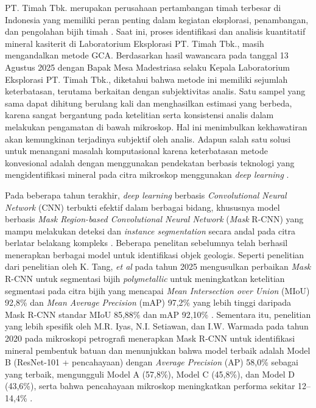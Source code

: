 PT. Timah Tbk. merupakan perusahaan pertambangan timah terbesar di Indonesia yang memiliki peran penting dalam kegiatan eksplorasi, penambangan, dan pengolahan bijih timah \cite{PTTimahWebsite}. Saat ini, proses identifikasi dan analisis kuantitatif mineral kasiterit di Laboratorium Eksplorasi PT. Timah Tbk., masih mengandalkan metode GCA. Berdasarkan hasil wawancara pada tanggal 13 Agustus 2025 dengan Bapak Mesa Madestriasa selaku Kepala Laboratorium Eksplorasi PT. Timah Tbk., diketahui bahwa metode ini memiliki sejumlah keterbatasan, terutama berkaitan dengan subjektivitas analis. Satu sampel yang sama dapat dihitung berulang kali dan menghasilkan estimasi yang berbeda, karena sangat bergantung pada ketelitian serta konsistensi analis dalam melakukan pengamatan di bawah mikroskop. Hal ini menimbulkan kekhawatiran akan kemungkinan terjadinya subjektif oleh analis. Adapun salah satu solusi untuk menangani masalah komputasional karena keterbatasan metode konvesional adalah dengan menggunakan pendekatan berbasis teknologi yang mengidentifikasi mineral pada citra mikroskop menggunakan  \textit{deep learning} \cite{ImprovedMaskRCNNOrePanggangan}. \par

Pada beberapa tahun terakhir, \textit{deep learning} berbasis \textit{Convolutional Neural Network} (CNN) terbukti efektif dalam berbagai bidang, khususnya model berbasis \textit{Mask Region-based Convolutional Neural Network} (\textit{Mask} R-CNN) yang mampu melakukan deteksi dan \textit{instance segmentation} secara andal pada citra berlatar belakang kompleks \cite{OreSegmentation2} \cite{ImprovedMaskRCNNOrePanggangan}. Beberapa penelitan sebelumnya telah berhasil menerapkan berbagai model untuk identifikasi objek geologis. Seperti penelitian dari penelitian oleh K. Tang, \textit{et al} pada tahun 2025 mengusulkan perbaikan \textit{Mask} R-CNN untuk segmentasi bijih \textit{polymetallic} untuk meningkatkan ketelitian segmentasi pada citra bijih yang mencapai \textit{Mean Intersection over Union} (MIoU) 92,8\% dan \textit{Mean Average Precision} (mAP) 97,2\% yang lebih tinggi daripada Mask R-CNN standar MIoU 85,88\% dan mAP 92,10\% \cite{OreSegmentation2}. Sementara itu, penelitian yang lebih spesifik oleh M.R. Iyas, N.I. Setiawan, dan I.W. Warmada pada tahun 2020 pada mikroskopi petrografi menerapkan Mask R-CNN untuk identifikasi mineral pembentuk batuan dan menunjukkan bahwa model terbaik adalah Model B (ResNet-101 + pencahayaan) dengan \textit{Average Precision} (AP) 58,0\% sebagai yang terbaik, mengungguli Model A (57,8\%), Model C (45,8\%), dan Model D (43,6\%), serta bahwa pencahayaan mikroskop meningkatkan performa sekitar 12–14,4\%  \cite{maskrcnnKalimantanMic}. \par

